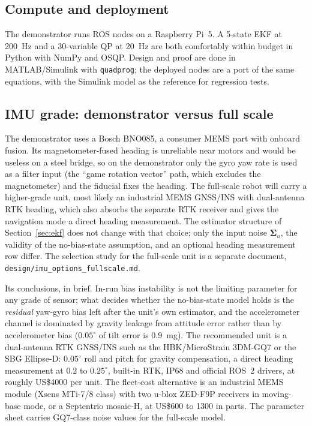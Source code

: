 \documentclass[11pt,a4paper]{article}
\newcommand{\mat}[1]{\bm{#1}}
\begin{document}
\subsection{Compute and deployment}
The demonstrator runs ROS nodes on a Raspberry Pi~5. A 5-state EKF at 200~Hz and a 30-variable QP at 20~Hz are both comfortably within budget in Python with NumPy and OSQP. Design and proof are done in MATLAB/Simulink with \texttt{quadprog}; the deployed nodes are a port of the same equations, with the Simulink model as the reference for regression tests.

\subsection{IMU grade: demonstrator versus full scale}
\label{sec:imu}
The demonstrator uses a Bosch BNO085, a consumer MEMS part with onboard fusion. Its magnetometer-fused heading is unreliable near motors and would be useless on a steel bridge, so on the demonstrator only the gyro yaw rate is used as a filter input (the ``game rotation vector'' path, which excludes the magnetometer) and the fiducial fixes the heading. The full-scale robot will carry a higher-grade unit, most likely an industrial MEMS GNSS/INS with dual-antenna RTK heading, which also absorbs the separate RTK receiver and gives the navigation mode a direct heading measurement. The estimator structure of Section~\ref{sec:ekf} does not change with that choice; only the input noise $\mat\Sigma_u$, the validity of the no-bias-state assumption, and an optional heading measurement row differ. The selection study for the full-scale unit is a separate document, \texttt{design/imu\_options\_fullscale.md}.

Its conclusions, in brief. In-run bias instability is not the limiting parameter for any grade of sensor; what decides whether the no-bias-state model holds is the \emph{residual} yaw-gyro bias left after the unit's own estimator, and the accelerometer channel is dominated by gravity leakage from attitude error rather than by accelerometer bias ($0.05^\circ$ of tilt error is $0.9$~mg). The recommended unit is a dual-antenna RTK GNSS/INS such as the HBK/MicroStrain 3DM-GQ7 or the SBG Ellipse-D: $0.05^\circ$ roll and pitch for gravity compensation, a direct heading measurement at $0.2$ to $0.25^\circ$, built-in RTK, IP68 and official ROS~2 drivers, at roughly US\$4000 per unit. The fleet-cost alternative is an industrial MEMS module (Xsens MTi-7/8 class) with two u-blox ZED-F9P receivers in moving-base mode, or a Septentrio mosaic-H, at US\$600 to 1300 in parts. The parameter sheet carries GQ7-class noise values for the full-scale model.
\end{document}
